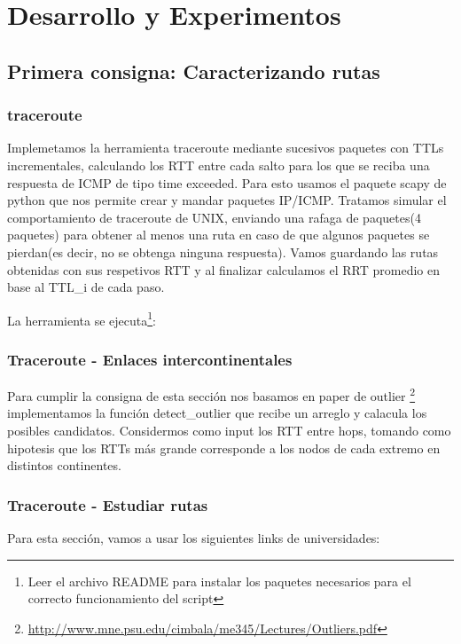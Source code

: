 \section{Desarrollo y Experimentos}

\subsection{Primera consigna: Caracterizando rutas}


\subsubsection{traceroute}
Implemetamos la herramienta traceroute mediante sucesivos paquetes con TTLs incrementales, calculando los RTT entre cada salto para los que se reciba una respuesta de ICMP de tipo time exceeded.
Para esto usamos el paquete scapy de python que nos permite crear y mandar paquetes IP/ICMP. Tratamos simular el comportamiento de traceroute de UNIX, enviando una rafaga de paquetes(4 paquetes) para obtener al menos una ruta en caso de que algunos paquetes se pierdan(es decir, no se obtenga ninguna respuesta). Vamos guardando las rutas obtenidas con sus respetivos RTT  y al finalizar calculamos el RRT promedio en base al TTL\_{i} de cada paso.

La herramienta se ejecuta\footnote{Leer el archivo README para instalar los paquetes necesarios para el correcto funcionamiento del script}:

\subsubsection{Traceroute - Enlaces intercontinentales}

Para cumplir la consigna de esta sección nos basamos en paper de outlier \footnote{ \hyperref[Cimbala]{http://www.mne.psu.edu/cimbala/me345/Lectures/Outliers.pdf} } implementamos la función detect\_outlier que recibe un arreglo y calacula los posibles candidatos. Considermos como input los RTT entre hops, tomando como hipotesis que los RTTs más grande corresponde a los nodos de cada extremo en distintos continentes.

\subsubsection{Traceroute - Estudiar rutas}

Para esta sección, vamos a usar los siguientes links de universidades:


